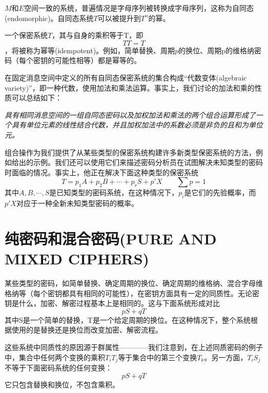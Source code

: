 \documentclass[]{article}
\begin{document}
$M$和$E$空间一致的系统，普遍情况是字母序列被转换成字母序列，这称为自同态(endomorphic)。自同态系统$T$可以被提升到$T^n$的幂。

一个保密系统$T$，其与自身的乘积等于T，即
\[TT=T\]
，将被称为幂等(idempotent)。例如，简单替换、周期$p$的换位、周期p的维格纳密码（每个密钥的可能性相等）都是幂等的。

在固定消息空间中定义的所有自同态保密系统的集合构成“代数变体(algebraic variety)”，即一种代数，使用加法和乘法运算。事实上，我们讨论的加法和乘的性质可以总结如下：\par
\textsl{具有相同消息空间的一组自同态密码以及加权加法和乘法的两个组合运算形成了一个具有单位元素的线性结合代数，并且加权加法中的系数必须是非负的且和为单位元。}

组合操作为我们提供了从某些类型的保密系统构建许多新类型保密系统的方法，例如给出的示例。我们还可以使用它们来描述密码分析员在试图解决未知类型的密码时面临的情况。事实上，他正在解决下面这种类型的保密系统
\[T=p_1A+p_2B+\cdots+p_rS+p'X \qquad \sum p=1\]
其中$A,B,\cdots,S$是已知类型的密码系统，在这种情况下，$p_i$是它们的先验概率，而$p'X$对应于一种全新未知类型密码的概率。

\newpage
%   
%

\section{纯密码和混合密码(PURE AND MIXED CIPHERS)}

某些类型的密码，如简单替换、确定周期的换位、确定周期的维格纳、混合字母维格纳等（每个密钥都具有相同的可能性），在密钥方面具有一定的同质性。无论密钥是什么，加密、解密过程基本上是相同的。这与下面系统形成对比
\[pS+qT\]
其中S是一个简单的替换，T是一个给定周期的换位。在这种情况下，整个系统根据使用的是替换还是换位而改变加密、解密流程。

这些系统中同质性的原因源于群属性————我们注意到，在上述同质密码的例子中，集合中任何两个变换的乘积$T_iT_j$等于集合中的第三个变换$T_k$。另一方面，$T_iS_j$不等于下面密码系统的任何变换：
\[pS+qT\]
它只包含替换和换位，不包含乘积。
\end{document}
